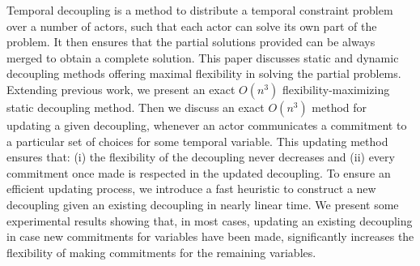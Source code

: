 Temporal decoupling is a method to distribute a temporal constraint problem over a number of actors, such that each actor can solve its own part of the problem. It then ensures that the partial solutions provided  can be always merged to obtain a complete solution. 
This paper discusses static and dynamic decoupling methods offering maximal flexibility in solving the partial problems.
Extending previous work, we present an exact $O(n^3)$ flexibility-maximizing static decoupling method.
Then we discuss an exact $O(n^3)$ method for updating a given decoupling, whenever an actor communicates a commitment to a particular set of choices for some temporal variable.
This updating method ensures that: (i) the flexibility of the decoupling never decreases and (ii) every commitment once made is respected in the updated decoupling.
To ensure an efficient updating process, we introduce a fast heuristic to construct a new decoupling given an existing decoupling in nearly linear time. We present some experimental results showing that, in most cases, updating an existing decoupling in case new commitments for variables have been made, significantly increases the flexibility of making commitments for the remaining variables.